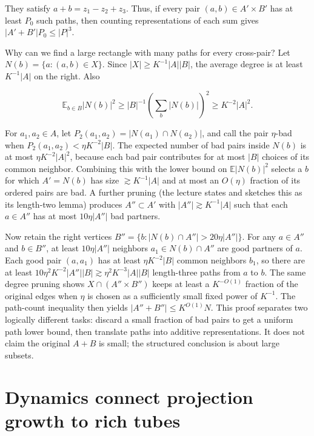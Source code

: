 They satisfy \(a+b=z_1-z_2+z_3\). Thus, if every pair \((a,b)\in A'\times B'\) has at least \(P_0\) such paths, then counting representations of each sum gives \(|A'+B'|P_0\le |P|^3\).

Why can we find a large rectangle with many paths for every cross-pair? Let \(N(b)=\{a:(a,b)\in X\}\). Since \(|X|\ge K^{-1}|A||B|\), the average degree is at least \(K^{-1}|A|\) on the right. Also

\[\mathbb E_{b\in B}|N(b)|^2\ge |B|^{-1}\left(\sum_b|N(b)|\right)^2\ge K^{-2}|A|^2.\]

For \(a_1,a_2\in A\), let \(P_2(a_1,a_2)=|N(a_1)\cap N(a_2)|\), and call the pair \(\eta\)-bad when \(P_2(a_1,a_2)<\eta K^{-2}|B|\). The expected number of bad pairs inside \(N(b)\) is at most \(\eta K^{-2}|A|^2\), because each bad pair contributes for at most \(|B|\) choices of its common neighbor. Combining this with the lower bound on \(\mathbb E|N(b)|^2\) selects a \(b\) for which \(A'=N(b)\) has size \(\gtrsim K^{-1}|A|\) and at most an \(O(\eta)\) fraction of its ordered pairs are bad. A further pruning (the lecture states and sketches this as its length-two lemma) produces \(A''\subset A'\) with \(|A''|\gtrsim K^{-1}|A|\) such that each \(a\in A''\) has at most \(10\eta|A''|\) bad partners.

Now retain the right vertices \(B''=\{b:|N(b)\cap A''|>20\eta|A''|\}\). For any \(a\in A''\) and \(b\in B''\), at least \(10\eta|A''|\) neighbors \(a_1\in N(b)\cap A''\) are good partners of \(a\). Each good pair \((a,a_1)\) has at least \(\eta K^{-2}|B|\) common neighbors \(b_1\), so there are at least \(10\eta^2K^{-2}|A''||B|\gtrsim\eta^2K^{-3}|A||B|\) length-three paths from \(a\) to \(b\). The same degree pruning shows \(X\cap(A''\times B'')\) keeps at least a \(K^{-O(1)}\) fraction of the original edges when \(\eta\) is chosen as a sufficiently small fixed power of \(K^{-1}\). The path-count inequality then yields \(|A''+B''|\le K^{O(1)}N\). This proof separates two logically different tasks: discard a small fraction of bad pairs to get a uniform path lower bound, then translate paths into additive representations. It does not claim the original \(A+B\) is small; the structured conclusion is about large subsets.

\section{Dynamics connect projection growth to rich tubes}\label{04-visual-computing-ii-ch033-dynamics-connect-projection-growth-to-rich-tubes}

